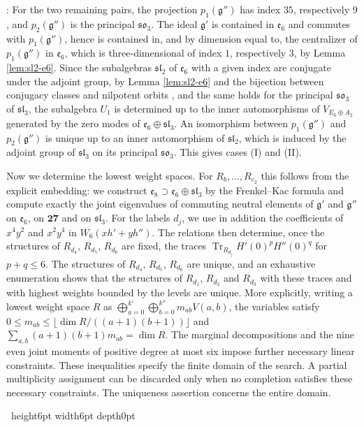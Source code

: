 \documentclass[leqno]{article}
\renewcommand{\leq}{\ensuremath{\leqslant}}
\newcommand{\qed}{\hfill \vrule height6pt  width6pt depth0pt}
\newenvironment{proof}[1][]{\noindent {\it Proof #1} : }{\hbox{~}\qed
\smallskip
}
\numberwithin{equation}{section}
\begin{document}
\begin{proof}
For the two remaining pairs, the projection $p_1(\mathfrak g'')$ has index $35$, respectively $9$, and $p_2(\mathfrak g'')$ is the principal $\mathfrak{so}_3$. The ideal $\mathfrak g'$ is contained in $\mathfrak e_6$ and commutes with $p_1(\mathfrak g'')$, hence is contained in, and by dimension equal to, the centralizer of $p_1(\mathfrak g'')$ in $\mathfrak e_6$, which is three-dimensional of index $1$, respectively $3$, by Lemma \ref{lem:sl2-e6}. Since the subalgebras $\mathfrak{sl}_2$ of $\mathfrak e_6$ with a given index are conjugate under the adjoint group, by Lemma \ref{lem:sl2-e6} and the bijection between conjugacy classes and nilpotent orbits \cite[Chapter 3]{CoM93}, and the same holds for the principal $\mathfrak{so}_3$ of $\mathfrak{sl}_3$, the subalgebra $U_1$ is determined up to the inner automorphisms of $V_{E_6 \oplus A_2}$ generated by the zero modes of $\mathfrak e_6 \oplus \mathfrak{sl}_3$. An isomorphism between $p_1(\mathfrak g'')$ and $p_2(\mathfrak g'')$ is unique up to an inner automorphism of $\mathfrak{sl}_2$, which is induced by the adjoint group of $\mathfrak{sl}_3$ on its principal $\mathfrak{so}_3$. This gives cases (I) and (II).

Now we determine the lowest weight spaces. For $R_b,\ldots,R_{c_2}$ this follows from the explicit embedding: we construct $\mathfrak e_8 \supset \mathfrak e_6 \oplus \mathfrak{sl}_3$ by the Frenkel--Kac formula and compute exactly the joint eigenvalues of commuting neutral elements of $\mathfrak g'$ and $\mathfrak g''$ on $\mathfrak e_6$, on $\mathbf{27}$ and on $\mathfrak{sl}_3$. For the labels $d_j$, we use in addition the coefficients of $x^4y^2$ and $x^2y^4$ in $W_6(xh'+yh'')$. The relations then determine, once the structures of $R_{d_4}$, $R_{d_5}$, $R_{d_6}$ are fixed, the traces $\operatorname{Tr}_{R_{d_j}}H'(0)^pH''(0)^q$ for $p+q \leq 6$. The structures of $R_{d_4}$, $R_{d_5}$, $R_{d_6}$ are unique, and an exhaustive enumeration shows that the structures of $R_{d_1}$, $R_{d_2}$ and $R_{d_3}$ with these traces and with highest weights bounded by the levels are unique. More explicitly, writing a lowest weight space $R$ as $\bigoplus_{a=0}^{k'}\bigoplus_{b=0}^{k''}m_{ab}V(a,b)$, the variables satisfy $0 \leq m_{ab} \leq \lfloor\dim R/((a+1)(b+1))\rfloor$ and $\sum_{a,b}(a+1)(b+1)m_{ab} = \dim R$. The marginal decompositions and the nine even joint moments of positive degree at most six impose further necessary linear constraints. These inequalities specify the finite domain of the search. A partial multiplicity assignment can be discarded only when no completion satisfies these necessary constraints. The uniqueness assertion concerns the entire domain.


\end{proof}
\end{document}
